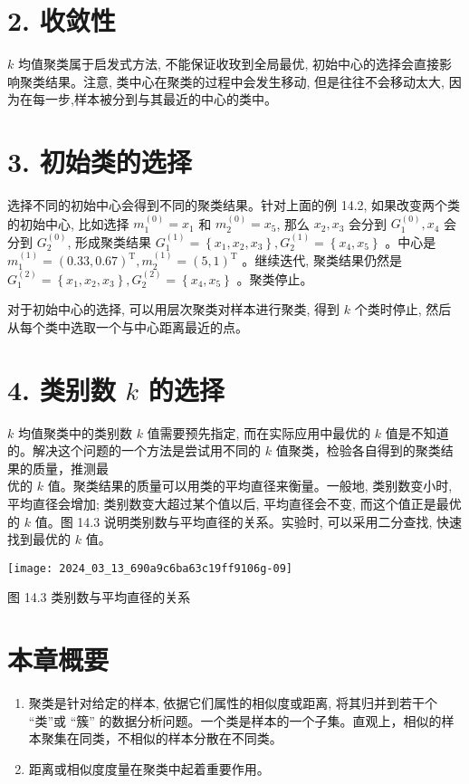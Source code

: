 \documentclass[10pt]{article}
\begin{document}
\section*{2. 收敛性}
$k$ 均值聚类属于启发式方法, 不能保证收玫到全局最优, 初始中心的选择会直接影响聚类结果。注意, 类中心在聚类的过程中会发生移动, 但是往往不会移动太大, 因为在每一步,样本被分到与其最近的中心的类中。

\section*{3. 初始类的选择}
选择不同的初始中心会得到不同的聚类结果。针对上面的例 14.2, 如果改变两个类的初始中心, 比如选择 $m_{1}^{(0)}=x_{1}$ 和 $m_{2}^{(0)}=x_{5}$, 那么 $x_{2}, x_{3}$ 会分到 $G_{1}^{(0)}, x_{4}$ 会分到 $G_{2}^{(0)}$, 形成聚类结果 $G_{1}^{(1)}=\left\{x_{1}, x_{2}, x_{3}\right\}, G_{2}^{(1)}=\left\{x_{4}, x_{5}\right\}$ 。中心是 $m_{1}^{(1)}=(0.33,0.67)^{\mathrm{T}}, m_{2}^{(1)}=(5,1)^{\mathrm{T}}$ 。继续迭代, 聚类结果仍然是 $G_{1}^{(2)}=\left\{x_{1}, x_{2}, x_{3}\right\}, G_{2}^{(2)}=\left\{x_{4}, x_{5}\right\}$ 。聚类停止。

对于初始中心的选择, 可以用层次聚类对样本进行聚类, 得到 $k$ 个类时停止, 然后从每个类中选取一个与中心距离最近的点。

\section*{4. 类别数 $k$ 的选择}
$k$ 均值聚类中的类别数 $k$ 值需要预先指定, 而在实际应用中最优的 $k$ 值是不知道的。解决这个问题的一个方法是尝试用不同的 $k$ 值聚类，检验各自得到的聚类结果的质量，推测最\\
优的 $k$ 值。聚类结果的质量可以用类的平均直径来衡量。一般地, 类别数变小时, 平均直径会增加; 类别数变大超过某个值以后, 平均直径会不变, 而这个值正是最优的 $k$ 值。图 14.3 说明类别数与平均直径的关系。实验时, 可以采用二分查找, 快速找到最优的 $k$ 值。

\begin{center}
\texttt{[image: 2024\_03\_13\_690a9c6ba63c19ff9106g-09]}
\end{center}

图 14.3 类别数与平均直径的关系

\section*{本章概要}
\begin{enumerate}
  \item 聚类是针对给定的样本, 依据它们属性的相似度或距离, 将其归并到若干个 “类”或 “簇” 的数据分析问题。一个类是样本的一个子集。直观上，相似的样本聚集在同类，不相似的样本分散在不同类。

  \item 距离或相似度度量在聚类中起着重要作用。

\end{enumerate}
\end{document}
